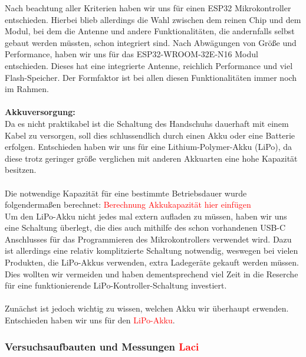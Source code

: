 \documentclass[11pt]{article}
\begin{document}
Nach beachtung aller Kriterien haben wir uns für einen ESP32 Mikrokontroller entschieden. Hierbei blieb allerdings die Wahl zwischen
dem reinen Chip und dem Modul, bei dem die Antenne und andere Funktionalitäten, die andernfalls selbst gebaut werden müssten,
schon integriert sind. Nach Abwägungen von Größe und Performance, haben wir uns für das ESP32-WROOM-32E-N16 Modul entschieden.
Dieses hat eine integrierte Antenne, reichlich Performance und viel Flash-Speicher. Der Formfaktor ist bei allen diesen 
Funktionalitäten immer noch im Rahmen. \\
\\
\textbf{Akkuversorgung:}
\\
Da es nicht praktikabel ist die Schaltung des Handschuhs dauerhaft mit einem Kabel zu versorgen, soll dies schlussendlich durch
einen Akku oder eine Batterie erfolgen. Entschieden haben wir uns für eine Lithium-Polymer-Akku (LiPo), da diese trotz geringer 
größe verglichen mit anderen Akkuarten eine hohe Kapazität besitzen. \\
\\
Die notwendige Kapazität für eine bestimmte Betriebsdauer wurde folgendermaßen berechnet:
\textcolor{red}{Berechnung Akkukapazität hier einfügen}
\\
Um den LiPo-Akku nicht jedes mal extern aufladen zu müssen, haben wir uns eine Schaltung überlegt, die dies auch mithilfe des
schon vorhandenen USB-C Anschlusses für das Programmieren des Mikrokontrollers verwendet wird. Dazu ist allerdings eine relativ 
komplitzierte Schaltung notwendig, weswegen bei vielen Produkten, die LiPo-Akkus verwenden, extra Ladegeräte gekauft werden müssen.
Dies wollten wir vermeiden und haben dementsprechend viel Zeit in die Reserche für eine funktionierende LiPo-Kontroller-Schaltung
investiert. \\
\\
Zunächst ist jedoch wichtig zu wissen, welchen Akku wir überhaupt erwenden. Entschieden haben wir uns für den \textcolor{red}{LiPo-Akku}.
\\

\subsubsection{Versuchsaufbauten und Messungen \textcolor{red}{Laci}}
\end{document}
